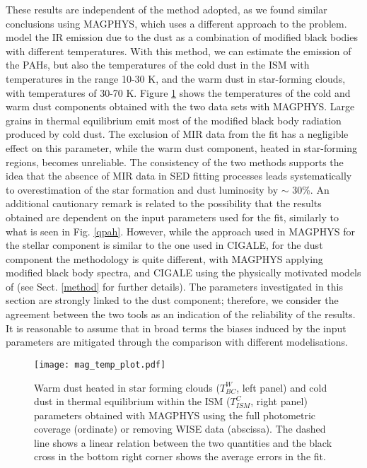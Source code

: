 \documentclass{aa}
\begin{document}
These results are independent of the method adopted, as we found similar conclusions using MAGPHYS, which uses a different approach to the problem. \cite{dac} model the IR emission due to the dust as a combination of modified black bodies with different temperatures. With this method, we can estimate the emission of the PAHs, but also the temperatures of the cold dust in the ISM with temperatures in the range 10-30 K, and the warm dust in star-forming clouds, with temperatures of 30-70 K. Figure \ref{temp} shows the temperatures of the cold and warm dust components obtained with the two data sets with MAGPHYS. Large grains in thermal equilibrium emit most of the modified black body radiation produced by cold dust. The exclusion of MIR data from the fit has a negligible effect on this parameter, while the warm dust component, heated in star-forming regions, becomes unreliable. The consistency of the two methods supports the idea that the absence of MIR data in SED fitting processes leads systematically to overestimation of the star formation and dust luminosity by $\sim$ 30\%. An additional cautionary remark is related to the possibility that the results obtained are dependent on the input parameters used for the fit, similarly to what is seen in Fig. \ref{qpah}. However, while the approach used in MAGPHYS for the stellar component is similar to the one used in CIGALE, for the dust component the methodology is quite different, with MAGPHYS applying modified black body spectra, and CIGALE using the physically motivated models of \cite{dra} (see Sect. \ref{method} for further details). The parameters investigated in this section are strongly linked to the dust component; therefore, we consider the agreement between the two tools as an indication of the  reliability of the results. It is reasonable to assume that in broad terms the biases induced by the input parameters are mitigated through the comparison with different modelisations.

 \begin{figure}\begin{center}
 \texttt{[image: mag\_temp\_plot.pdf]}
 \end{center} 
 \caption{Warm dust heated in star forming clouds ($T^W_{BC}$, left panel) and cold dust in thermal equilibrium within the ISM ($T^C_{ISM}$, right panel) parameters obtained with MAGPHYS \citep{dac} using the full photometric coverage (ordinate) or removing WISE data (abscissa). The dashed line shows a linear relation between the two quantities and the black cross in the bottom right corner shows the average errors in the fit.}\label{temp}\end{figure}
\end{document}

